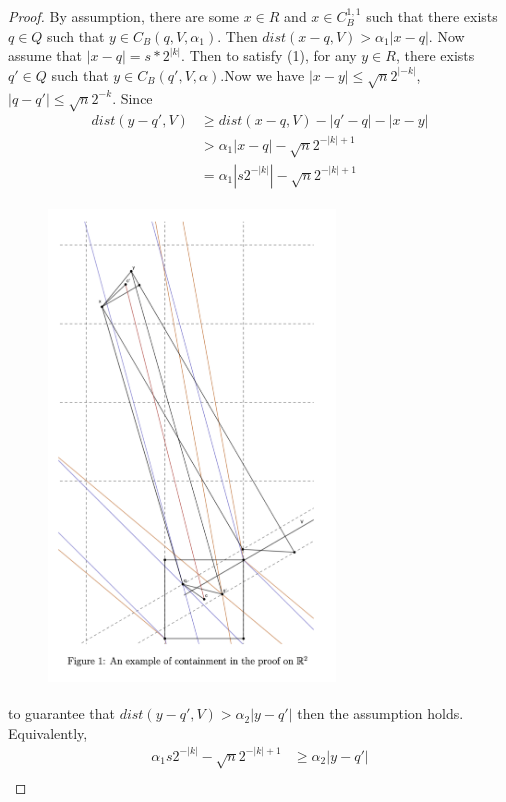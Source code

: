\documentclass{article}
\begin{document}
\begin{proof}
By assumption, there are some $x\in R$ and $x \in C^{1,1}_B$ such that there exists $q \in Q$ such that $y \in C_B(q,V,\alpha_1)$. Then $dist(x-q,V)> \alpha _1 |x - q|$. Now assume that $|x - q| = s*2^{|k|}$. Then to satisfy (1), for any $y \in R$, there exists $q' \in Q$ such that $y \in C_B(q', V, \alpha)$.Now we have $|x - y| \leq \sqrt{n}2^{|-k|}$, $|q - q'|\leq \sqrt{n}2^{-k}$. Since 
\begin{equation*}
\begin{aligned}
    dist(y - q', V) &\geq dist(x - q, V) - |q' - q| - |x - y| \\
    & > \alpha_1|x - q| - \sqrt{n}2^{-|k|+1} \\
    & = \alpha_1|s2^{-|k|}| - \sqrt{n}2^{-|k| + 1}
\end{aligned}
\end{equation*}
\begin{figure}
    \centering
    \includegraphics[width = 3in, height = 5in]{dist.png}
    \label{fig:my_label}
\end{figure}
to guarantee that $dist(y - q', V) > \alpha_2|y - q'|$ then the assumption holds. Equivalently,
\begin{equation*}
\begin{aligned}
    \alpha_1s2^{-|k|} - \sqrt{n}2^{-|k| + 1} & \geq \alpha_2|y - q'| \\

\end{aligned}
\end{equation*}
\end{proof}
\end{document}
